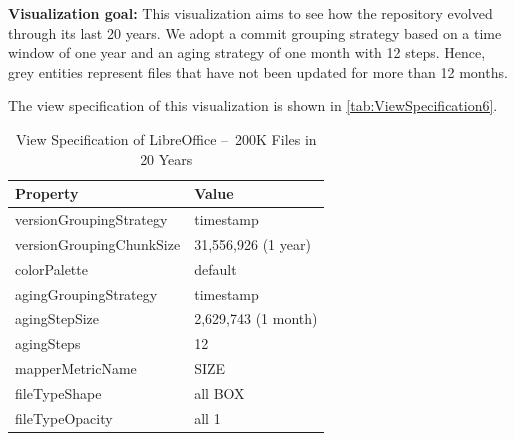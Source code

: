 \bigbreak
\noindent
\textbf{Visualization goal:}
This visualization aims to see how the repository evolved through its last 20 years. We adopt a commit grouping strategy based on a time window of one year and an aging strategy of one month with 12 steps. Hence, grey entities represent files that have not been updated for more than 12 months. 


The view specification of this visualization is shown in \autoref{tab:ViewSpecification6}.
\begin{table}[h]
	\small
    \centering
    \begin{tabular}{@{}ll@{}} 
        \toprule
        \textbf{Property} & \textbf{Value} \\\midrule
        versionGroupingStrategy & timestamp\\ 
		versionGroupingChunkSize & 31,556,926 (1 year)\\
		colorPalette & default\\
		agingGroupingStrategy & timestamp \\
		agingStepSize & 2,629,743 (1 month) \\
		agingSteps & 12 \\
		mapperMetricName & SIZE \\
		fileTypeShape & all BOX \\
		fileTypeOpacity & all 1 \\\bottomrule
    \end{tabular}
            \caption{View Specification of LibreOffice – 200K Files in 20 Years}
    \label{tab:ViewSpecification6}
\end{table}

